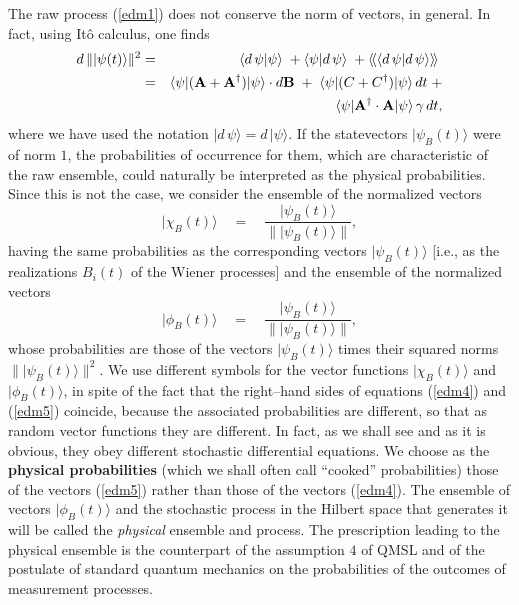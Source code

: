 \documentclass[12pt]{article}
\newcommand{\llangle}{\langle\!\langle}
\newcommand{\rrangle}{\rangle\!\rangle}
\begin{document}
The raw process (\ref{edm1}) does not conserve the norm of
vectors, in general. In fact, using It\^o calculus, one finds
\begin{eqnarray} \label{edm7}
d\, \| |\psi(t)\rangle\|^{2} & = & \langle d\,\psi |\psi\rangle \;
+ \langle \psi |d\,\psi\rangle \; + \llangle \langle d\,\psi
|d\,\psi\rangle\rrangle \;
\nonumber \\
& = & \langle\psi |({\bf A} + {\bf A}^{\dagger}) | \psi\rangle
\cdot d{\bf B} \; + \; \langle\psi| (C + C^{\dagger})
|\psi\rangle\, dt \; + \nonumber \\
& & \langle\psi | {\bf A}^{\dagger} \cdot{\bf A} | \psi\rangle \,
\gamma\, dt,
\end{eqnarray}
where we have used the notation $|d\,\psi\rangle =
d\,|\psi\rangle$. If the statevectors $|\psi_{B}(t)\rangle$ were
of norm $1$, the probabilities of occurrence for them, which are
characteristic of the raw ensemble, could naturally be interpreted
as the physical probabilities. Since this is not the case, we
consider the ensemble of the normalized vectors
\begin{equation} \label{edm4}
|\chi_{B}(t)\rangle \quad = \quad \frac{|\psi_{B}(t)\rangle}{\|
|\psi_{B}(t)\rangle\|},
\end{equation}
having the same probabilities as the corresponding vectors
$|\psi_{B}(t)\rangle$ [i.e., as the realizations $B_{i}(t)$ of the
Wiener processes] and the ensemble of the normalized vectors
\begin{equation} \label{edm5}
|\phi_{B}(t)\rangle \quad = \quad \frac{|\psi_{B}(t)\rangle}{\|
|\psi_{B}(t)\rangle\|},
\end{equation}
whose probabilities are those of the vectors $|\psi_{B}(t)\rangle$
times their squared norms $\| |\psi_{B}(t)\rangle\|^{2}$. We use
different symbols for the vector functions $|\chi_{B}(t)\rangle$
and $|\phi_{B}(t)\rangle$, in spite of the fact that the
right--hand sides of equations (\ref{edm4}) and (\ref{edm5})
coincide, because the associated probabilities are different, so
that as random vector functions they are different. In fact, as we
shall see and as it is obvious, they obey different stochastic
differential equations. We choose as the {\bf physical
probabilities} (which we shall often call ``cooked''
probabilities) those of the vectors (\ref{edm5}) rather than those
of the vectors (\ref{edm4}). The ensemble of vectors
$|\phi_{B}(t)\rangle$ and the stochastic process in the Hilbert
space that generates it will be called the {\it physical} ensemble
and process. The prescription leading to the physical ensemble is
the counterpart of the assumption $4$ of QMSL and of the postulate
of standard quantum mechanics on the probabilities of the outcomes
of measurement processes.
\end{document}
